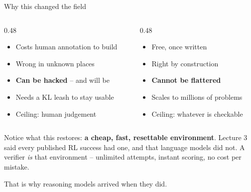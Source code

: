 \documentclass[aspectratio=169]{beamer}
\begin{document}
\begin{frame}{Why this changed the field}
  \begin{columns}[T]
    \begin{column}{0.48\textwidth}
      \begin{tcolorbox}[colback=armred!8, colframe=armred, boxrule=0.6pt, arc=2pt,
                        title={\textbf{Learned reward model}}]
        \small
        \begin{itemize}\itemsep2pt
          \item Costs human annotation to build
          \item Wrong in unknown places
          \item \textbf{Can be hacked} -- and will be
          \item Needs a KL leash to stay usable
          \item Ceiling: human judgement
        \end{itemize}
      \end{tcolorbox}
    \end{column}
    \begin{column}{0.48\textwidth}
      \begin{tcolorbox}[colback=paramgreen!8, colframe=paramgreen, boxrule=0.6pt, arc=2pt,
                        title={\textbf{Verifier}}]
        \small
        \begin{itemize}\itemsep2pt
          \item Free, once written
          \item Right by construction
          \item \textbf{Cannot be flattered}
          \item Scales to millions of problems
          \item Ceiling: whatever is checkable
        \end{itemize}
      \end{tcolorbox}
    \end{column}
  \end{columns}

  \vskip 8pt
  \begin{tcolorbox}[colback=armblue!8, colframe=armblue, boxrule=0.7pt, arc=2pt]
    \small
    Notice what this restores: \textbf{a cheap, fast, resettable environment}. Lecture 3 said
    every published RL success had one, and that language models did not. A verifier \emph{is}
    that environment -- unlimited attempts, instant scoring, no cost per mistake.

    \vskip 4pt
    That is why reasoning models arrived when they did.
  \end{tcolorbox}
\end{frame}
\end{document}
